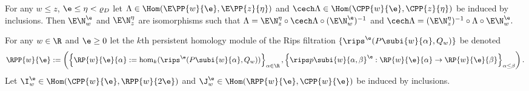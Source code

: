\begin{lemma}\label{cor:excisive_nerve}
  For any $w\leq z$, $\e\leq \eta < \varrho_D$ let $\Lambda\in\Hom(\E\PP{w}{\e},\E\PP{z}{\eta})$ and $\cech\Lambda\in\Hom(\CPP{w}{\e},\CPP{z}{\eta})$ be induced by inclusions.
  Then $\E\N_w^\e$ and $\E\N_z^\eta$ are isomorphisms such that $\Lambda = \E\N_{z}^{\eta}\circ \cech\Lambda\circ (\E\N_w^\e)^{-1}$ and $\cech\Lambda = (\E\N_{z}^{\eta})^{-1}\circ \Lambda\circ \E\N_w^\e.$
\end{lemma}

For any $w\in\R$ and $\e\geq 0$ let the $k$th persistent homology module of the Rips filtration $\{\rips^\e(P\subi{w}{\alpha}, Q_w)\}$ be denoted
\[\RPP{w}{\e} := \left(\left\{\RP{w}{\e}{\alpha} := \hom_k(\rips^\e(P\subi{w}{\alpha}, Q_w))\right\}_{\alpha\in\R}, \left\{\rips p\subi{w}{\alpha,\beta}^\e : \RP{w}{\e}{\alpha}\to\RP{w}{\e}{\beta}\right\}_{\alpha\leq\beta}\right).\]
Let $\I_w^\e\in\Hom(\CPP{w}{\e}, \RPP{w}{2\e})$ and $\J_w^\e\in\Hom(\RPP{w}{\e},\CPP{w}{\e})$ be induced by inclusions.
